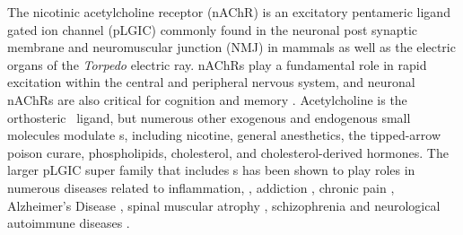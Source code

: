 
The nicotinic acetylcholine receptor (nAChR) is an excitatory pentameric ligand gated ion channel (pLGIC) commonly found in the neuronal post synaptic membrane and neuromuscular junction (NMJ) in mammals %
as well as the electric organs of the \textit{Torpedo} electric ray. %
nAChRs play a fundamental role in rapid excitation within the central and peripheral nervous system, and neuronal nAChRs are also critical for cognition and memory \cite{Dani2001b, Changeux2015}. Acetylcholine is the orthosteric \nachr~ligand, but numerous other exogenous and endogenous small molecules modulate \nachr s, including nicotine, general anesthetics, the tipped-arrow poison curare,  phospholipids, cholesterol, and cholesterol-derived hormones.\cite{Klaassen2015,Taly2009}  %
The larger pLGIC super family that includes \nachr s has been shown to play roles in numerous diseases related to inflammation, \cite{Patel2017,Yocum2017,Cornelison2016}, addiction \cite{Cornelison2016}, chronic pain \cite{Xiong2012}, Alzheimer's Disease \cite{Walstab2010,Picciotto_Neuroprotection_2008,MartinRuiz_4_1999}, spinal muscular atrophy \cite{Arnold_Reduced_2004}, schizophrenia \cite{Haydar2010} and neurological autoimmune diseases \cite{Lennon_Immunization_2003}.

